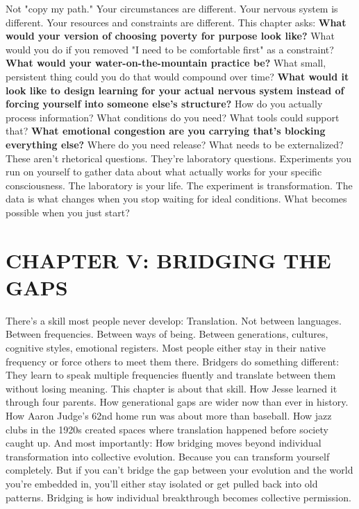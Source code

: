 Not "copy my path." Your circumstances are different. Your nervous system is different. Your resources and constraints are different.
This chapter asks:
\textbf{What would your version of choosing poverty for purpose look like?}
What would you do if you removed "I need to be comfortable first" as a constraint?
\textbf{What would your water-on-the-mountain practice be?}
What small, persistent thing could you do that would compound over time?
\textbf{What would it look like to design learning for your actual nervous system instead of forcing yourself into someone else's structure?}
How do you actually process information? What conditions do you need? What tools could support that?
\textbf{What emotional congestion are you carrying that's blocking everything else?}
Where do you need release? What needs to be externalized?
These aren't rhetorical questions. They're laboratory questions.
Experiments you run on yourself to gather data about what actually works for your specific consciousness.
The laboratory is your life. The experiment is transformation. The data is what changes when you stop waiting for ideal conditions.
What becomes possible when you just start?

\cleardoublepage

\chapter{CHAPTER V: BRIDGING THE GAPS}

There's a skill most people never develop:
Translation.
Not between languages. Between frequencies. Between ways of being. Between generations, cultures, cognitive styles, emotional registers.
Most people either stay in their native frequency or force others to meet them there.
Bridgers do something different: They learn to speak multiple frequencies fluently and translate between them without losing meaning.
This chapter is about that skill.
How Jesse learned it through four parents. How generational gaps are wider now than ever in history. How Aaron Judge's 62nd home run was about more than baseball. How jazz clubs in the 1920s created spaces where translation happened before society caught up.
And most importantly: How bridging moves beyond individual transformation into collective evolution.
Because you can transform yourself completely. But if you can't bridge the gap between your evolution and the world you're embedded in, you'll either stay isolated or get pulled back into old patterns.
Bridging is how individual breakthrough becomes collective permission.

